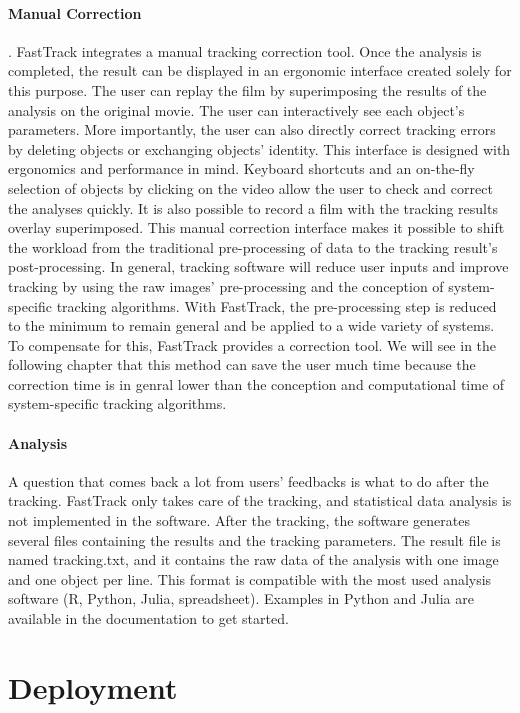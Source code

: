 		\paragraph{Manual Correction}.
        FastTrack integrates a manual tracking correction tool. Once the analysis is completed, the result can be displayed in an ergonomic interface created solely for this purpose. The user can replay the film by superimposing the results of the analysis on the original movie. The user can interactively see each object's parameters. More importantly, the user can also directly correct tracking errors by deleting objects or exchanging objects' identity.
        This interface is designed with ergonomics and performance in mind. Keyboard shortcuts and an on-the-fly selection of objects by clicking on the video allow the user to check and correct the analyses quickly. It is also possible to record a film with the tracking results overlay superimposed.
        This manual correction interface makes it possible to shift the workload from the traditional pre-processing of data to the tracking result's post-processing. In general, tracking software will reduce user inputs and improve tracking by using the raw images' pre-processing and the conception of system-specific tracking algorithms. With FastTrack, the pre-processing step is reduced to the minimum to remain general and be applied to a wide variety of systems. To compensate for this, FastTrack provides a correction tool. We will see in the following chapter that this method can save the user much time because the correction time is in genral lower than the conception and computational time of system-specific tracking algorithms.

		\paragraph{Analysis}
        A question that comes back a lot from users' feedbacks is what to do after the tracking. FastTrack only takes care of the tracking, and statistical data analysis is not implemented in the software. After the tracking, the software generates several files containing the results and the tracking parameters. The result file is named tracking.txt, and it contains the raw data of the analysis with one image and one object per line. This format is compatible with the most used analysis software (R, Python, Julia, spreadsheet). Examples in Python and Julia are available in the documentation to get started.

	\section{Deployment}
